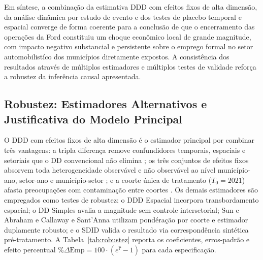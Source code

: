 \documentclass[12pt,a4paper]{article}
\begin{document}
Em s\'intese, a combina\c{c}\~ao da estimativa DDD com efeitos fixos de alta dimens\~ao, da an\'alise din\^amica por estudo de evento e dos testes de placebo temporal e espacial converge de forma coerente para a conclus\~ao de que o encerramento das opera\c{c}\~oes da Ford constituiu um choque econ\^omico local de grande magnitude, com impacto negativo substancial e persistente sobre o emprego formal no setor automobilist\'ico dos munic\'ipios diretamente expostos. A consist\^encia dos resultados atrav\'es de m\'ultiplos estimadores e m\'ultiplos testes de validade refor\c{c}a a robustez da infer\^encia causal apresentada.

\subsection{Robustez: Estimadores Alternativos e Justificativa do Modelo Principal}
\label{sec:robustez_modelos}

O DDD com efeitos fixos de alta dimens\~ao \'e o estimador principal por combinar tr\^es vantagens: a tripla diferen\c{c}a remove confundidores temporais, espaciais e setoriais que o DD convencional n\~ao elimina \parencite{olden2022,berck2016}; os tr\^es conjuntos de efeitos fixos absorvem toda heterogeneidade observ\'avel e n\~ao observ\'avel ao n\'ivel munic\'ipio-ano, setor-ano e munic\'ipio-setor \parencite{wooldridge2010}; e a coorte \'unica de tratamento ($T_0 = 2021$) afasta preocupa\c{c}\~oes com contamina\c{c}\~ao entre coortes \parencite{sun2021,callaway2021}. Os demais estimadores s\~ao empregados como testes de robustez: o DDD Espacial incorpora transbordamento espacial; o DD Simples avalia a magnitude sem controle intersetorial; Sun e Abraham \parencite{sun2021} e Callaway e Sant'Anna \parencite{callaway2021} utilizam pond\'era\c{c}\~ao por coorte e estimador duplamente robusto; e o SDID \parencite{arkhangelsky2021} valida o resultado via correspond\^encia sint\'etica pr\'e-tratamento. A Tabela~\ref{tab:robustez} reporta os coeficientes, erros-padr\~ao e efeito percentual $\%\Delta\text{Emp} = 100\cdot(e^{\hat{\tau}}-1)$ para cada especifica\c{c}\~ao.
\end{document}
